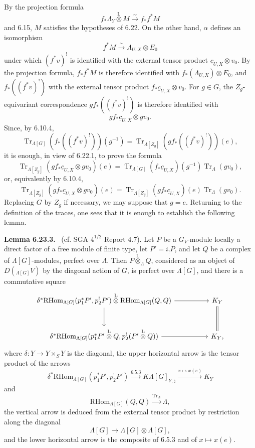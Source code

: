 \documentclass[11pt]{article}
\newenvironment{statement}[1]{\par\medskip\noindent\textbf{#1.}\ }{\par\medskip}
\providecommand{\RHom}{\mathrm{RHom}}
\providecommand{\Tr}{\operatorname{Tr}}
\providecommand{\Tr}{\operatorname{Tr}}
\providecommand{\lten}{\overset{\mathrm L}{\otimes}}
\providecommand{\Tr}{\operatorname{Tr}}
\providecommand{\RHom}{\mathrm{RHom}}
\providecommand{\lten}{\overset{\mathrm L}{\otimes}}
\providecommand{\RHom}{\mathrm R\mathcal{H}om}
\providecommand{\lten}{\overset{\mathrm L}{\otimes}}
\providecommand{\Tr}{\operatorname{Tr}}
\providecommand{\lten}{\overset{\mathrm L}{\otimes}}
\providecommand{\lten}{\overset{\mathrm L}{\otimes}}
\providecommand{\lten}{\overset{\mathrm L}{\otimes}}
\providecommand{\RHom}{\mathrm{RHom}}
\begin{document}
By the projection formula
\[
f_*\Lambda_Y\lten M\xrightarrow{\sim}f_*f^*M
\]
and 6.15, $M$ satisfies the hypotheses of 6.22. On the other hand, $\alpha$ defines an isomorphism
\[
f^*M\xrightarrow{\sim}\Lambda_{U,X}\otimes E_0
\]
under which $(f^*v)^!$ is identified with the external tensor product $\underline c_{U,X}\otimes v_0$. By the projection formula, $f_*f^*M$ is therefore identified with $f_*(\Lambda_{U,X})\otimes E_0$, and $f_*((f^*v)^!)$ with the external tensor product $f_*\underline c_{U,X}\otimes v_0$. For $g\in G$, the $Z_g$-equivariant correspondence $gf_*((f^*v)^!)$ is therefore identified with
\[
gf_*\underline c_{U,X}\otimes gv_0.
\]
Since, by 6.10.4,
\[
\Tr_{\Lambda[G]}(f_*((f^*v)^!))(g^{-1})
=
\Tr_{\Lambda[Z_g]}(gf_*((f^*v)^!))(e),
\]
it is enough, in view of 6.22.1, to prove the formula
\[
\Tr_{\Lambda[Z_g]}(gf_*\underline c_{U,X}\otimes gv_0)(e)
=
\Tr_{\Lambda[G]}(f_*\underline c_{U,X})(g^{-1})\Tr_{\Lambda}(gv_0),
\]
or, equivalently by 6.10.4,
\begin{equation}
\Tr_{\Lambda[Z_g]}(gf_*\underline c_{U,X}\otimes gv_0)(e)
=
\Tr_{\Lambda[Z_g]}(gf_*\underline c_{U,X})(e)\Tr_{\Lambda}(gv_0).
\tag{6.23.2}
\end{equation}
Replacing $G$ by $Z_g$ if necessary, we may suppose that $g=e$. Returning to the definition of the traces, one sees that it is enough to establish the following lemma.

\begin{statement}{Lemma 6.23.3}
(cf. SGA $4^{1/2}$ Report 4.7). Let $P$ be a $G_V$-module locally a direct factor of a free module of finite type, let $P'=i_!P$, and let $Q$ be a complex of $\Lambda[G]$-modules, perfect over $\Lambda$. Then $P\lten_{\Lambda}Q$, considered as an object of $D({}_{\Lambda[G]}V)$ by the diagonal action of $G$, is perfect over $\Lambda[G]$, and there is a commutative square
\[
\begin{tikzcd}[column sep=huge,row sep=large]
\delta^*\RHom_{\Lambda[G]}(p_1^*P',p_2^!P')\lten
\RHom_{\Lambda[G]}(Q,Q) \arrow[r] \arrow[d]
& K_Y \arrow[d,equal]\\
\delta^*\RHom_{\Lambda[G]}(p_1^*P'\lten Q,p_2^!(P'\lten Q)) \arrow[r]
& K_Y ,
\end{tikzcd}
\]
where $\delta:Y\to Y\times_SY$ is the diagonal, the upper horizontal arrow is the tensor product of the arrows
\[
\delta^*\RHom_{\Lambda[G]}(p_1^*P',p_2^!P')\xrightarrow{6.5.3}
K\Lambda[G]_{Y,\natural}\xrightarrow{x\mapsto x(e)}K_Y
\]
and
\[
\RHom_{\Lambda[G]}(Q,Q)\xrightarrow{\Tr_{\Lambda}}\Lambda,
\]
the vertical arrow is deduced from the external tensor product by restriction along the diagonal
\[
\Lambda[G]\to\Lambda[G]\otimes\Lambda[G],
\]
and the lower horizontal arrow is the composite of 6.5.3 and of $x\mapsto x(e)$.
\end{statement}
\end{document}
